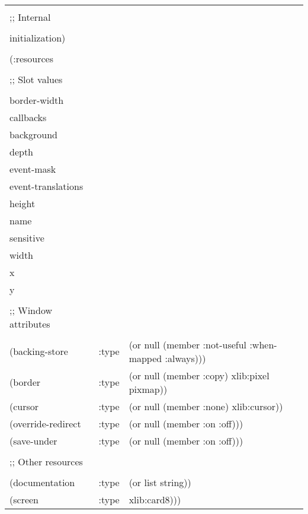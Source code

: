 \begin{flushright}
\parbox[t]{6.125in}{
\tt
\begin{tabular}{lll}
\raggedright
&\\
;; Internal\footnotemark \\
&\\
   initialization) \\
&\\
(:resources & \\
& \\
;; Slot values \\
& \\
 border-width       \\
 callbacks \\
 background \\ 
 depth \\
 event-mask \\
 event-translations \\
 height \\
 name \\
 sensitive \\
 width \\
 x \\
 y \\
&\\
;; Window attributes \\
&\\
 (backing-store &      :type & (or null (member :not-useful :when-mapped
:always))) \\
  (border &             :type & (or null (member :copy) xlib:pixel pixmap)) \\
  (cursor &             :type & (or null (member :none) xlib:cursor)) \\
  (override-redirect &  :type & (or null (member :on :off))) \\
  (save-under &         :type & (or null (member :on :off))) \\
&\\
;; Other resources \\
&\\
  (documentation &      :type & (or list string)) \\
  (screen &             :type & xlib:card8)))
\end{tabular}
}

\end{flushright}


